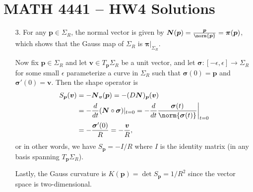 \documentclass[a4paper,12pt]{article}
\newcommand{\bs}{\boldsymbol}
\theoremstyle{remark}
\begin{document}
\section*{MATH 4441 -- HW4 Solutions}
\begin{enumerate}
    \item[3.]
        For any $\bs{p} \in \Sigma_R$, the normal vector is given by $\bs{N}(\bs{p}) = \frac{\bs{p}}{\norm{\bs{p}}} = \bs{\pi}(\bs{p})$, which shows that the Gauss map of $\Sigma_R$ is $\bs{\pi}|_{\Sigma_R}$. \par
        Now fix $\bs{p} \in \Sigma_R$ and let $\bs{v} \in T_{\bs{p}} \Sigma_R$ be a unit vector, and let $\bs{\sigma} : [-\epsilon, \epsilon] \to \Sigma_R$ for some small $\epsilon$ parameterize a curve in $\Sigma_R$ such that $\bs{\sigma}(0) = \bs{p}$ and $\bs{\sigma}'(0) = \bs{v}$. Then the shape operator is
        \begin{align*}
            S_{\bs{p}}(\bs{v}) &= -\bs{N}_{\bs{v}}(\bs{p}) = -(D\bs{N})_{\bs{p}}(\bs{v}) \\
            &= -\frac{d}{dt}(\bs{N} \circ \bs{\sigma})|_{t = 0} = -\frac{d}{dt}\frac{\bs{\sigma}(t)}{\norm{\bs{\sigma}(t)}}\bigg|_{t = 0} \\
            &= -\frac{\bs{\sigma}'(0)}{R} = -\frac{\bs{v}}{R},
        \end{align*}
        or in other words, we have $S_{\bs{p}} = -I/R$ where $I$ is the identity matrix (in any basis spanning $T_{\bs{p}}\Sigma_R$). \par
        Lastly, the Gauss curvature is $K(\bs{p}) = \det S_{\bs{p}} = 1/R^2$ since the vector space is two-dimensional.


\end{enumerate}
\end{document}
